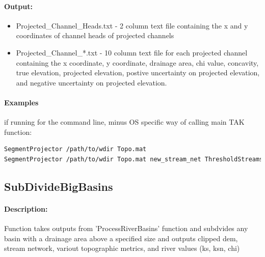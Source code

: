\paragraph{Output:}
\begin{itemize}
\item Projected\_Channel\_Heads.txt - 2 column text file containing the x and y coordinates of channel heads of projected channels
\item Projected\_Channel\_*.txt - 10 column text file for each projected channel containing the x coordinate, y coordinate, drainage area, chi value,
concavity, true elevation, projected elevation, postive uncertainty on projected elevation, and negative uncertainty on projected elevation.
\end{itemize}

\paragraph{Examples} if running for the command line, minus OS specific way of calling main TAK function:
\begin{lstlisting}[language=bash]
SegmentProjector /path/to/wdir Topo.mat 
SegmentProjector /path/to/wdir Topo.mat new_stream_net ThresholdStreams.mat pick_method stream
\end{lstlisting}

\subsection{SubDivideBigBasins}
\paragraph{Description:}
Function takes outputs from 'ProcessRiverBasins' function and subdvides any basin with a drainage area above a specified size and
outputs clipped dem, stream network, variout topographic metrics, and river values (ks, ksn, chi)

